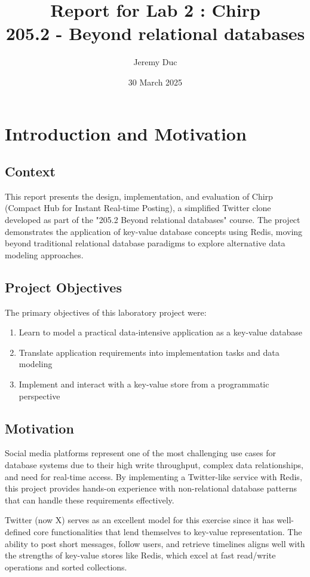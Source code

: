 \documentclass[a4paper,11pt]{article}
\title{
    \vspace{-1.5cm}
    \Huge{\textbf{Report for Lab 2 : Chirp }} \\
    \Large{205.2 - Beyond relational databases}
}
\author{Jeremy Duc}
\date{30 March 2025}
\begin{document}
\maketitle

\tableofcontents
\clearpage
\pagestyle{fancy}
\newpage

\section{Introduction and Motivation}

\subsection{Context}
This report presents the design, implementation, and evaluation of Chirp (Compact Hub for Instant Real-time Posting), a simplified Twitter clone developed as part of the "205.2 Beyond relational databases" course. The project demonstrates the application of key-value database concepts using Redis, moving beyond traditional relational database paradigms to explore alternative data modeling approaches.

\subsection{Project Objectives}
The primary objectives of this laboratory project were:
\begin{enumerate}
    \item Learn to model a practical data-intensive application as a key-value database
    \item Translate application requirements into implementation tasks and data modeling
    \item Implement and interact with a key-value store from a programmatic perspective
\end{enumerate}

\subsection{Motivation}
Social media platforms represent one of the most challenging use cases for database systems due to their high write throughput, complex data relationships, and need for real-time access. By implementing a Twitter-like service with Redis, this project provides hands-on experience with non-relational database patterns that can handle these requirements effectively. 

Twitter (now X) serves as an excellent model for this exercise since it has well-defined core functionalities that lend themselves to key-value representation. The ability to post short messages, follow users, and retrieve timelines aligns well with the strengths of key-value stores like Redis, which excel at fast read/write operations and sorted collections.
\end{document}
